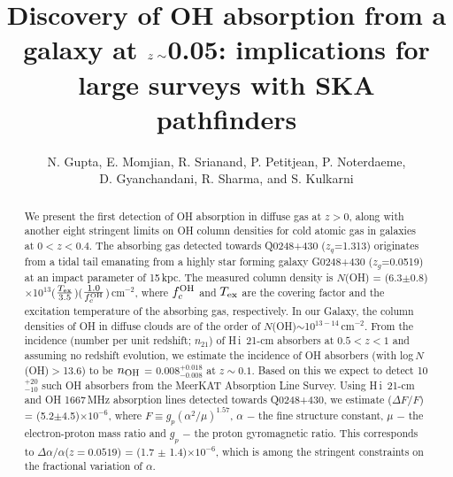 \documentclass[iop,apjl,numberedappendix,appendixfloats,twocolappendix,revtex4]{emulateapj}
\newcommand{\hi}{\mbox{H\,{\sc i}}}
\newcommand{\cmsq}{cm$^{-2}$}
\begin{document}
\title{Discovery of OH absorption from a galaxy at $\lowercase{z}\sim$0.05: implications for\\ large surveys with SKA pathfinders} 

\author{N. Gupta,  
E. Momjian,  
R. Srianand,  
P. Petitjean,  
P. Noterdaeme, \\ 
D. Gyanchandani,   
R. Sharma, and 
S. Kulkarni  
}    


\begin{abstract}


We present the first detection of OH absorption in diffuse gas at $z>0$, along with another eight stringent 
limits on OH column densities for cold atomic gas in galaxies at $0<z<0.4$. 
The absorbing gas detected towards Q0248+430 ($z_q$=1.313) originates from a tidal tail emanating from a highly star forming galaxy 
G0248+430 ($z_g$=0.0519) at an impact parameter of 15\,kpc.  
The measured column density is $N$(OH) = (6.3$\pm$0.8)$\times$10$^{13}$($\frac{T_{\rm ex}}{3.5}$)($\frac{1.0}{f_c^{\rm OH}}$)\,\cmsq, where $f_c^{\rm OH}$ and 
$T_{\rm ex}$ are the covering factor and the excitation temperature of the absorbing gas, respectively.
In our Galaxy, the column densities of OH in diffuse clouds are of the order of $N$(OH)$\sim$10$^{13-14}$\,\cmsq.
From the incidence (number per unit redshift; $n_{21}$) of \hi\ 21-cm absorbers at $0.5<z<1$ and assuming no redshift evolution, 
we estimate the incidence of OH absorbers (with log\,$N$(OH)$>$13.6) to be $n_{\rm OH}$ = $0.008^{+0.018}_{-0.008}$ at $z\sim0.1$. 
Based on this we expect to detect 10$^{+20}_{-10}$ such OH absorbers from the MeerKAT Absorption Line Survey.
Using \hi\ 21-cm and OH 1667\,MHz absorption lines detected towards Q0248+430, we estimate 
($\Delta F/F$) = (5.2$\pm$4.5)$\times 10^{-6}$, where $F \equiv g_p (\alpha^2/\mu)^{1.57}$, 
$\alpha$ $-$ the fine structure constant, $\mu$ $-$ the electron-proton mass ratio and $g_p$ $-$ the proton gyromagnetic ratio.  
This corresponds to $\Delta\alpha/\alpha$($z=0.0519$) = (1.7 $\pm$ 1.4)$\times 10^{-6}$, which is among the stringent 
constraints on the fractional variation of $\alpha$. 

\end{abstract}  
\end{document}

